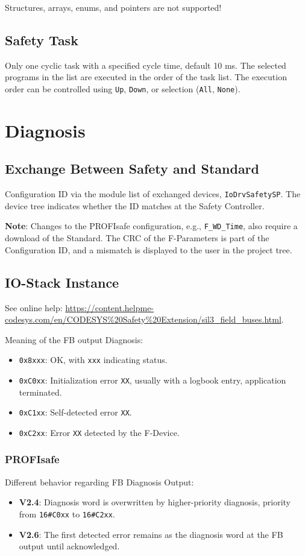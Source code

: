 \documentclass[a4paper,12pt]{article}
\begin{document}
Structures, arrays, enums, and pointers are not supported!

\subsection{Safety Task}
Only one cyclic task with a specified cycle time, default 10 ms. The selected programs in the list are executed in the order of the task list. The execution order can be controlled using \texttt{Up}, \texttt{Down}, or selection (\texttt{All}, \texttt{None}).

\section{Diagnosis}
\subsection{Exchange Between Safety and Standard}
Configuration ID via the module list of exchanged devices, \texttt{IoDrvSafetySP}. The device tree indicates whether the ID matches at the Safety Controller.

\textbf{Note}: Changes to the PROFIsafe configuration, e.g., \texttt{F\_WD\_Time}, also require a download of the Standard. The CRC of the F-Parameters is part of the Configuration ID, and a mismatch is displayed to the user in the project tree.

\subsection{IO-Stack Instance}
See online help: \url{https://content.helpme-codesys.com/en/CODESYS\%20Safety\%20Extension/sil3_field_buses.html}.

Meaning of the FB output Diagnosis:
\begin{itemize}
	\item \texttt{0x8xxx}: OK, with \texttt{xxx} indicating status.
	\item \texttt{0xC0xx}: Initialization error \texttt{XX}, usually with a logbook entry, application terminated.
	\item \texttt{0xC1xx}: Self-detected error \texttt{XX}.
	\item \texttt{0xC2xx}: Error \texttt{XX} detected by the F-Device.
\end{itemize}

\subsubsection{PROFIsafe}
Different behavior regarding FB Diagnosis Output:
\begin{itemize}
	\item \textbf{V2.4}: Diagnosis word is overwritten by higher-priority diagnosis, priority from \texttt{16\#C0xx} to \texttt{16\#C2xx}.
	\item \textbf{V2.6}: The first detected error remains as the diagnosis word at the FB output until acknowledged.
\end{itemize}
\end{document}
